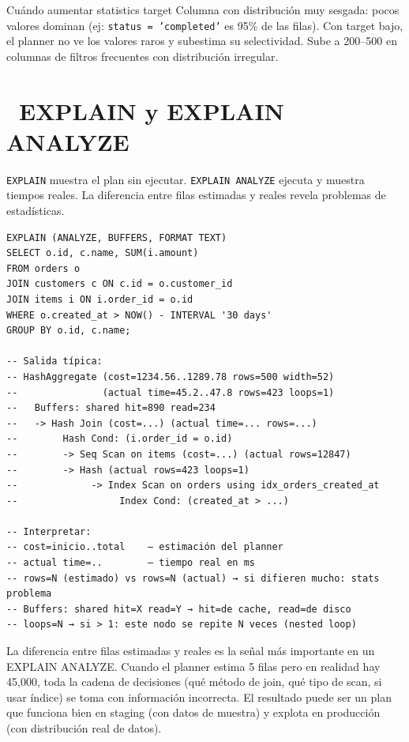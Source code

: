 \begin{tipbox}{Cuándo aumentar statistics target}
Columna con distribución muy sesgada: pocos valores dominan (ej: \texttt{status = 'completed'} es 95\% de las filas).
Con target bajo, el planner no ve los valores raros y subestima su selectividad.
Sube a 200--500 en columnas de filtros frecuentes con distribución irregular.
\end{tipbox}

\section[EXPLAIN y EXPLAIN ANALYZE]{~EXPLAIN y EXPLAIN ANALYZE}

\texttt{EXPLAIN} muestra el plan sin ejecutar. \texttt{EXPLAIN ANALYZE} ejecuta y muestra tiempos reales.
La diferencia entre filas estimadas y reales revela problemas de estadísticas.

\begin{lstlisting}[caption={Anatomía de EXPLAIN ANALYZE}]
EXPLAIN (ANALYZE, BUFFERS, FORMAT TEXT)
SELECT o.id, c.name, SUM(i.amount)
FROM orders o
JOIN customers c ON c.id = o.customer_id
JOIN items i ON i.order_id = o.id
WHERE o.created_at > NOW() - INTERVAL '30 days'
GROUP BY o.id, c.name;

-- Salida típica:
-- HashAggregate (cost=1234.56..1289.78 rows=500 width=52)
--               (actual time=45.2..47.8 rows=423 loops=1)
--   Buffers: shared hit=890 read=234
--   -> Hash Join (cost=...) (actual time=... rows=...)
--        Hash Cond: (i.order_id = o.id)
--        -> Seq Scan on items (cost=...) (actual rows=12847)
--        -> Hash (actual rows=423 loops=1)
--             -> Index Scan on orders using idx_orders_created_at
--                  Index Cond: (created_at > ...)

-- Interpretar:
-- cost=inicio..total    — estimación del planner
-- actual time=..        — tiempo real en ms
-- rows=N (estimado) vs rows=N (actual) → si difieren mucho: stats problema
-- Buffers: shared hit=X read=Y → hit=de cache, read=de disco
-- loops=N → si > 1: este nodo se repite N veces (nested loop)
\end{lstlisting}

La diferencia entre filas estimadas y reales es la señal más importante en un EXPLAIN ANALYZE.
Cuando el planner estima 5 filas pero en realidad hay 45,000, toda la cadena de decisiones (qué método de join, qué tipo de scan, si usar índice) se toma con información incorrecta.
El resultado puede ser un plan que funciona bien en staging (con datos de muestra) y explota en producción (con distribución real de datos).

